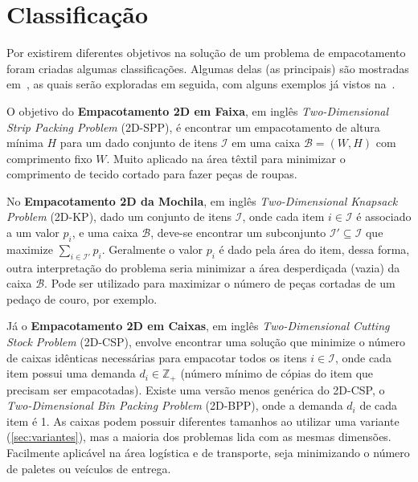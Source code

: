 \section{Classificação}\label{sec:classificacao}

Por existirem diferentes objetivos na solução de um problema de empacotamento foram criadas algumas
classificações.
Algumas delas (as principais) são mostradas em~\cite{exact-solution-techniques,2DPackLib}, as quais
serão exploradas em seguida, com alguns exemplos já vistos na~.

O objetivo do \textbf{Empacotamento 2D em Faixa}, em inglês \textit{Two-Dimensional Strip Packing
Problem} (2D-SPP), é encontrar um empacotamento de altura mínima $H$ para um dado conjunto de itens
$\mathcal{I}$ em uma caixa $\mathcal{B} = (W, H)$ com comprimento fixo $W$.
Muito aplicado na área têxtil para minimizar o comprimento de tecido cortado para fazer peças
de roupas.

No \textbf{Empacotamento 2D da Mochila}, em inglês \textit{Two-Dimensional Knapsack Problem} (2D-KP),
dado um conjunto de itens $\mathcal{I}$, onde cada item $i \in \mathcal{I}$ é associado a um valor
$p_i$, e uma caixa $\mathcal{B}$, deve-se encontrar um subconjunto $\mathcal{I}' \subseteq
\mathcal{I}$ que maximize $\sum_{i \in \mathcal{I'}}^{} p_i$.
Geralmente o valor $p_i$ é dado pela área do item, dessa forma, outra interpretação do problema
seria minimizar a área desperdiçada (vazia) da caixa $\mathcal{B}$.
Pode ser utilizado para maximizar o número de peças cortadas de um pedaço de couro, por exemplo.


Já o \textbf{Empacotamento 2D em Caixas}, em inglês \textit{Two-Dimensional Cutting Stock Problem}
(2D-CSP), envolve encontrar uma solução que minimize o número de caixas idênticas necessárias para
empacotar todos os itens $i \in \mathcal{I}$, onde cada item possui uma demanda
$d_i \in \mathbb{Z}_+$ (número mínimo de cópias do item que precisam ser empacotadas).
Existe uma versão menos genérica do 2D-CSP, o \textit{Two-Dimensional Bin Packing Problem} (2D-BPP),
onde a demanda $d_i$ de cada item é 1.
As caixas podem possuir diferentes tamanhos ao utilizar uma variante (\cref{sec:variantes}),
mas a maioria dos problemas lida com as mesmas dimensões.
Facilmente aplicável na área logística e de transporte, seja minimizando o número de paletes
ou veículos de entrega.


